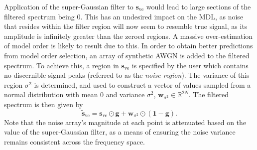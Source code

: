 Application of the
super-Gaussian filter to $\symbf{s}_{\text{ve}}$
would lead to large sections of the filtered spectrum being $0$. This has an
undesired impact on the \ac{MDL}, as noise that resides within the filter
region will now seem to resemble true signal,
as its amplitude is infinitely greater than the zeroed regions. A massive
over-estimation of model order is likely to result due to this.
In order to obtain better predictions from model order selection, an array of
synthetic \ac{AWGN} is
added to the filtered spectrum. To achieve this, a region in
$\symbf{s}_{\text{ve}}$ is specified by the user which contains no discernible
signal peaks (referred to as the \emph{noise region}). The variance of this region
$\sigma^2$ is determined, and used to construct a vector of values sampled from
a normal distribution with mean $0$ and variance $\sigma^2$,
$\symbf{w}_{\sigma^2} \in \mathbb{R}^{2N}$.
The filtered spectrum is then given by
\begin{equation}
    \widetilde{\symbf{s}}_{\text{ve}} = \symbf{s}_{\text{ve}} \odot \symbf{g} + \symbf{w}_{\sigma^2} \odot \left(\symbf{1} - \symbf{g} \right).
    \label{eq:Sve-tilde}
\end{equation}
Note that the noise array's magnitude at each point is attenuated based on the
value of the super-Gaussian filter, as a means of ensuring the noise variance
remains consistent across the frequency space.

